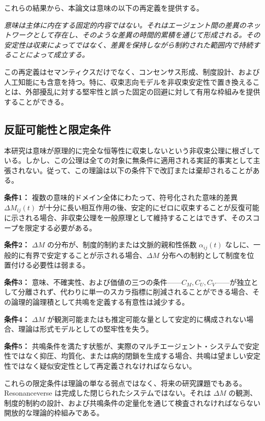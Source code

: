 \documentclass[11pt,a4paper]{article}
\theoremstyle{definition}
\begin{document}
これらの結果から、本論文は意味の以下の再定義を提供する。

\textit{意味は主体に内在する固定的内容ではない。それはエージェント間の差異のネットワークとして存在し、そのような差異の時間的累積を通じて形成される。その安定性は収束によってではなく、差異を保持しながら制約された範囲内で持続することによって成立する。}

この再定義はセマンティクスだけでなく、コンセンサス形成、制度設計、および人工知能にも含意を持つ。特に、収束志向モデルを非収束安定性で置き換えることは、外部擾乱に対する堅牢性と誤った固定の回避に対して有用な枠組みを提供することができる。

\subsection{反証可能性と限定条件}

本研究は意味が原理的に完全な恒等性に収束しないという非収束公理に根ざしている。しかし、この公理は全ての対象に無条件に適用される実証的事実として主張されない。従って、この理論は以下の条件下で改訂または棄却されることがある。

\textbf{条件1：} 複数の意味的ドメイン全体にわたって、符号化された意味的差異 $\Delta M_{ij}(t)$ が十分に長い相互作用の後、安定的にゼロに収束することが反復可能に示される場合、非収束公理を一般原理として維持することはできず、そのスコープを限定する必要がある。

\textbf{条件2：} $\Delta M$ の分布が、制度的制約または文脈的親和性係数 $\alpha_{ij}(t)$ なしに、一般的に有界で安定することが示される場合、$\Delta M$ 分布への制約として制度を位置付ける必要性は弱まる。

\textbf{条件3：} 意味、不確実性、および価値の三つの条件——$C_M, C_U, C_V$——が独立として分離されず、代わりに単一のスカラ指標に削減されることができる場合、その論理的論理積として共鳴を定義する有意性は減少する。

\textbf{条件4：} $\Delta M$ が観測可能またはも推定可能な量として安定的に構成されない場合、理論は形式モデルとしての堅牢性を失う。

\textbf{条件5：} 共鳴条件を満たす状態が、実際のマルチエージェント・システムで安定性ではなく抑圧、均質化、または病的閉鎖を生成する場合、共鳴は望ましい安定性ではなく疑似安定性として再定義されなければならない。

これらの限定条件は理論の単なる弱点ではなく、将来の研究課題でもある。Resonanceverse は完成した閉じられたシステムではない。それは $\Delta M$ の観測、制度的制約の設計、および共鳴条件の定量化を通じて検査されなければならない開放的な理論的枠組みである。
\end{document}
